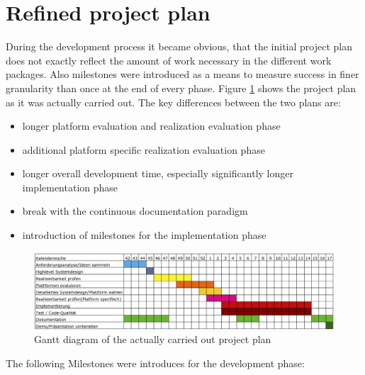 \section{Refined project plan}
During the development process it became obvious, that the initial project plan does not exactly reflect the amount of work necessary in the different work packages. Also milestones were introduced as a means to measure success in finer granularity than once at the end of every phase. Figure \ref{gantt2} shows the project plan as it was actually carried out. The key differences between the two plans are: 
\begin{itemize}
\item longer platform evaluation and realization evaluation phase
\item additional platform specific realization evaluation phase
\item longer overall development time, especially significantly longer implementation phase
\item break with the continuous documentation paradigm
\item introduction of milestones for the implementation phase
\end{itemize} 
\begin{figure}[h!]
\centering
\includegraphics[width=16cm]{pics/gantt3.png}
\caption{Gantt diagram of the actually carried out project plan}
\label{gantt2}
\end{figure}
The following Milestones were introduces for the development phase:
